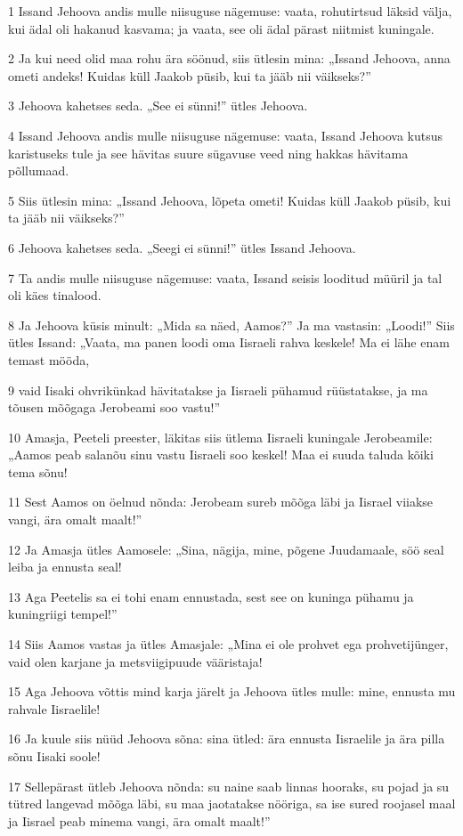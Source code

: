\par 1 Issand Jehoova andis mulle niisuguse nägemuse: vaata, rohutirtsud läksid välja, kui ädal oli hakanud kasvama; ja vaata, see oli ädal pärast niitmist kuningale.
\par 2 Ja kui need olid maa rohu ära söönud, siis ütlesin mina: „Issand Jehoova, anna ometi andeks! Kuidas küll Jaakob püsib, kui ta jääb nii väikseks?”
\par 3 Jehoova kahetses seda. „See ei sünni!” ütles Jehoova.
\par 4 Issand Jehoova andis mulle niisuguse nägemuse: vaata, Issand Jehoova kutsus karistuseks tule ja see hävitas suure sügavuse veed ning hakkas hävitama põllumaad.
\par 5 Siis ütlesin mina: „Issand Jehoova, lõpeta ometi! Kuidas küll Jaakob püsib, kui ta jääb nii väikseks?”
\par 6 Jehoova kahetses seda. „Seegi ei sünni!” ütles Issand Jehoova.
\par 7 Ta andis mulle niisuguse nägemuse: vaata, Issand seisis looditud müüril ja tal oli käes tinalood.
\par 8 Ja Jehoova küsis minult: „Mida sa näed, Aamos?” Ja ma vastasin: „Loodi!” Siis ütles Issand: „Vaata, ma panen loodi oma Iisraeli rahva keskele! Ma ei lähe enam temast mööda,
\par 9 vaid Iisaki ohvrikünkad hävitatakse ja Iisraeli pühamud rüüstatakse, ja ma tõusen mõõgaga Jerobeami soo vastu!”
\par 10 Amasja, Peeteli preester, läkitas siis ütlema Iisraeli kuningale Jerobeamile: „Aamos peab salanõu sinu vastu Iisraeli soo keskel! Maa ei suuda taluda kõiki tema sõnu!
\par 11 Sest Aamos on öelnud nõnda: Jerobeam sureb mõõga läbi ja Iisrael viiakse vangi, ära omalt maalt!”
\par 12 Ja Amasja ütles Aamosele: „Sina, nägija, mine, põgene Juudamaale, söö seal leiba ja ennusta seal!
\par 13 Aga Peetelis sa ei tohi enam ennustada, sest see on kuninga pühamu ja kuningriigi tempel!”
\par 14 Siis Aamos vastas ja ütles Amasjale: „Mina ei ole prohvet ega prohvetijünger, vaid olen karjane ja metsviigipuude vääristaja!
\par 15 Aga Jehoova võttis mind karja järelt ja Jehoova ütles mulle: mine, ennusta mu rahvale Iisraelile!
\par 16 Ja kuule siis nüüd Jehoova sõna: sina ütled: ära ennusta Iisraelile ja ära pilla sõnu Iisaki soole!
\par 17 Sellepärast ütleb Jehoova nõnda: su naine saab linnas hooraks, su pojad ja su tütred langevad mõõga läbi, su maa jaotatakse nööriga, sa ise sured roojasel maal ja Iisrael peab minema vangi, ära omalt maalt!”

